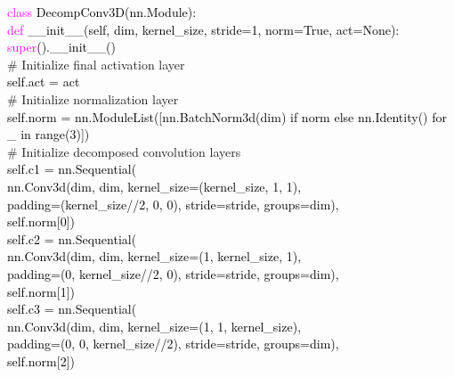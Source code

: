 \newcommand{\PyComment}[1]{\ttfamily\textcolor{commentcolor}{\# #1}}  %
\newcommand{\PyCode}[1]{\ttfamily\textcolor{black}{#1}} %

\begin{algorithm}[h]
\SetAlgoLined
    \PyCode{\textcolor{magenta}{class} DecompConv3D(nn.Module):} \\
    \Indp
        \PyCode{\textcolor{magenta}{def} \_\_init\_\_(self, dim, kernel\_size, stride=1, norm=True, act=None):} \\
        \Indp
            \PyCode{\textcolor{magenta}{super}().\_\_init\_\_()} \\
            \PyComment{Initialize final activation layer} \\            
            \PyCode{self.act = act} \\
            \PyComment{Initialize normalization layer} \\
            \PyCode{self.norm = nn.ModuleList([nn.BatchNorm3d(dim) if norm else nn.Identity() for \_ in range(3)])} \\
            \PyComment{Initialize decomposed convolution layers} \\
            \PyCode{self.c1 = nn.Sequential(} \\
            \Indp
                \PyCode{nn.Conv3d(dim, dim, kernel\_size=(kernel\_size, 1, 1),} \\
                \PyCode{padding=(kernel\_size//2, 0, 0), stride=stride, groups=dim),} \\
                \PyCode{self.norm[0])} \\
            \Indm
            \PyCode{self.c2 = nn.Sequential(} \\
            \Indp
                \PyCode{nn.Conv3d(dim, dim, kernel\_size=(1, kernel\_size, 1),} \\
                \PyCode{padding=(0, kernel\_size//2, 0), stride=stride, groups=dim),} \\
                \PyCode{self.norm[1])} \\
            \Indm
            \PyCode{self.c3 = nn.Sequential(} \\
            \Indp
                \PyCode{nn.Conv3d(dim, dim, kernel\_size=(1, 1, kernel\_size),} \\
                \PyCode{padding=(0, 0, kernel\_size//2), stride=stride, groups=dim),} \\
                \PyCode{self.norm[2])} \\
            \Indm
        \Indm


\end{algorithm}
